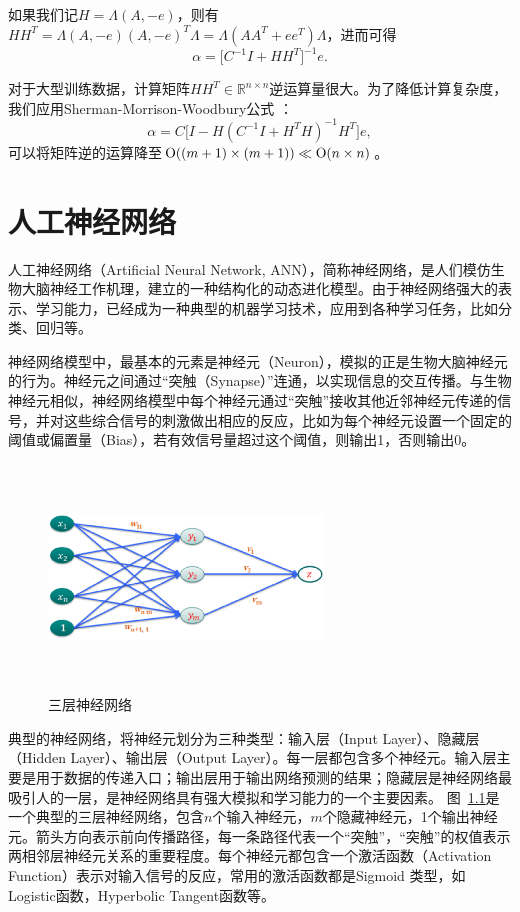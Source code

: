 如果我们记$H = \Lambda (A, -e)$，则有$H H^T = \Lambda (A,-e)(A,-e)^T \Lambda = \Lambda (A A^T + ee^T)\Lambda$，进而可得
\begin{equation}
    \alpha = \big[C^{-1} I + H H^T \big]^{-1} e.
\end{equation}

对于大型训练数据，计算矩阵$HH^T\in \mathbb R^{n\times n}$逆运算量很大。为了降低计算复杂度，我们应用Sherman-Morrison-Woodbury公式
\cite{sherman1949adjustment,sherman1950adjustment,woodbury1950inverting}：
\begin{equation}
    \alpha = C\big[I - H(C^{-1} I + H^T H)^{-1} H^T \big]e,
\end{equation}
可以将矩阵逆的运算降至$\operatorname{\mathrm{O}} ((m+1)\times (m+1))\ll \operatorname{\mathrm{O}} (n\times n)$。

\chapter{人工神经网络}
人工神经网络（Artificial Neural Network, ANN），简称神经网络，是人们模仿生物大脑神经工作机理，建立的一种结构化的动态进化模型。由于神经网络强大的表示、学习能力，已经成为一种典型的机器学习技术，应用到各种学习任务，比如分类、回归等。

神经网络模型中，最基本的元素是神经元（Neuron），模拟的正是生物大脑神经元的行为。神经元之间通过“突触（Synapse）”连通，以实现信息的交互传播。与生物神经元相似，神经网络模型中每个神经元通过“突触”接收其他近邻神经元传递的信号，并对这些综合信号的刺激做出相应的反应，比如为每个神经元设置一个固定的阈值或偏置量（Bias），若有效信号量超过这个阈值，则输出1，否则输出0。

\begin{figure}[htbp]
  \centering
  \includegraphics[width=0.65\textwidth,height=6cm]{figures/neuralnetwork.eps}
  \caption{三层神经网络}\label{fig:neuralnetwork}
\end{figure}

典型的神经网络，将神经元划分为三种类型：输入层（Input Layer）、隐藏层（Hidden Layer）、输出层（Output Layer）。每一层都包含多个神经元。输入层主要是用于数据的传递入口；输出层用于输出网络预测的结果；隐藏层是神经网络最吸引人的一层，是神经网络具有强大模拟和学习能力的一个主要因素。
图~\ref{fig:neuralnetwork}是一个典型的三层神经网络，包含$n$个输入神经元，$m$个隐藏神经元，1个输出神经元。箭头方向表示前向传播路径，每一条路径代表一个“突触”，“突触”的权值表示两相邻层神经元关系的重要程度。每个神经元都包含一个激活函数（Activation Function）表示对输入信号的反应，常用的激活函数都是Sigmoid 类型，如Logistic函数，Hyperbolic Tangent函数等。

